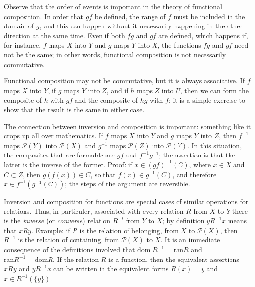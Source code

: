 Observe that the order of events is important in the theory of functional composition. In order that $gf$ be defined, the range of $f$ must be included in the domain of $g$, and this can happen without it necessarily happening in the other direction at the same time. Even if both $fg$ and $gf$ are defined, which happens if, for instance, $f$ maps $X$ into $Y$ and $g$ maps $Y$ into $X$, the functions $fg$ and $gf$ need not be the same; in other words, functional composition is not necessarily commutative. 

Functional composition may not be commutative, but it is always associative. If $f$ maps $X$ into $Y$, if $g$ maps $Y$ into $Z$, and if $h$ maps $Z$ into $U$, then we can form the composite of $h$ with $gf$ and the composite of $hg$ with $f$; it is a simple exercise to show that the result is the same in either case. 

The connection between inversion and composition is important; something like it crops up all over mathematics. If $f$ maps $X$ into $Y$ and $g$ maps $Y$ into $Z$, then $f^{-1}$ maps $\mathcal{P}(Y)$ into $\mathcal{P}(X)$ and $g^{-1}$ maps $\mathcal{P}(Z)$ into $\mathcal{P}(Y)$. In this situation, the composites that are formable are $gf$ and $f^{-1}g^{-1}$; the assertion is that the latter is the inverse of the former. Proof: if $x \in (gf)^{-1}(C)$, where $x \in X$ and $C \subset Z$, then $g(f(x)) \in C$, so that $f(x) \in g^{-1}(C)$, and therefore $x \in f^{-1}(g^{-1}(C))$; the steps of the argument are reversible. 

Inversion and composition for functions are special cases of similar operations for relations. Thus, in particuler, associated with every relation $R$ from $X$ to $Y$ there is the \textit{inverse} (or \textit{converse}) relation $R^{-l}$ from $Y$ to $X$; by definition $y R^{-1} x$ means that $xRy$. Example: if $R$ is the relation of belonging, from $X$ to $\mathcal{P}(X)$, then $R^{-1}$ is the relation of containing, from $\mathcal{P}(X)$ to $X$. It is an immediate consequence of the definitions involved that $\text{dom }R^{-1} = \text{ran} R$ and $\text{ran}R^{-1} = \text{dom} R$. If the relation $R$ is a function, then the equivalent assertions $xRy$ and $yR^{-1}x$ can be written in the equivalent forms $R(x) = y$ and $x \in R^{-1}( \{ y \} )$. 


